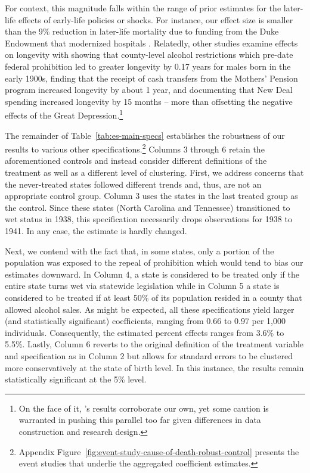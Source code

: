 \documentclass[12pt]{article}
\begin{document}
For context, this magnitude falls within the range of prior estimates for the later-life effects of early-life policies or shocks.
For instance, our effect size is smaller than the 9\% reduction in later-life mortality due to funding from the Duke Endowment that modernized hospitals .
Relatedly, other studies examine effects on longevity with  showing that county-level alcohol restrictions which pre-date federal prohibition led to greater longevity by 0.17 years for males born in the early 1900s,  finding that the receipt of cash transfers from the Mothers' Pension program increased longevity by about 1 year, and  documenting that New Deal spending increased longevity by 15 months -- more than offsetting the negative effects of the Great Depression.\footnote{On the face of it, 's results corroborate our own, yet some caution is warranted in pushing this parallel too far given differences in data construction and research design.}

The remainder of Table~\ref{tab:es-main-specs} establishes the robustness of our results to various other specifications.\footnote{Appendix Figure~\ref{fig:event-study-cause-of-death-robust-control} presents the event studies that underlie the aggregated coefficient estimates.} 
Columns 3 through 6 retain the aforementioned controls and instead consider different definitions of the treatment as well as a different level of clustering. 
First, we address concerns that the never-treated states followed different trends and, thus, are not an appropriate control group. 
Column 3 uses the states in the last treated group as the control. 
Since these states (North Carolina and Tennessee) transitioned to wet status in 1938, this specification necessarily drops observations for 1938 to 1941. 
In any case, the estimate is hardly changed. 

Next, we contend with the fact that, in some states, only a portion of the population was exposed to the repeal of prohibition which would tend to bias our estimates downward. 
In Column 4, a state is considered to be treated only if the entire state turns wet via statewide legislation while in Column 5 a state is considered to be treated if at least 50\% of its population resided in a county that allowed alcohol sales. As might be expected, all these specifications yield larger (and statistically significant) coefficients, ranging from 0.66 to 0.97 per 1,000 individuals. 
Consequently, the estimated percent effects ranges from 3.6\% to 5.5\%. 
Lastly, Column 6 reverts to the original definition of the treatment variable and specification as in Column 2 but allows for standard errors to be clustered more conservatively at the state of birth level. 
In this instance, the results remain statistically significant at the 5\% level.
\end{document}
